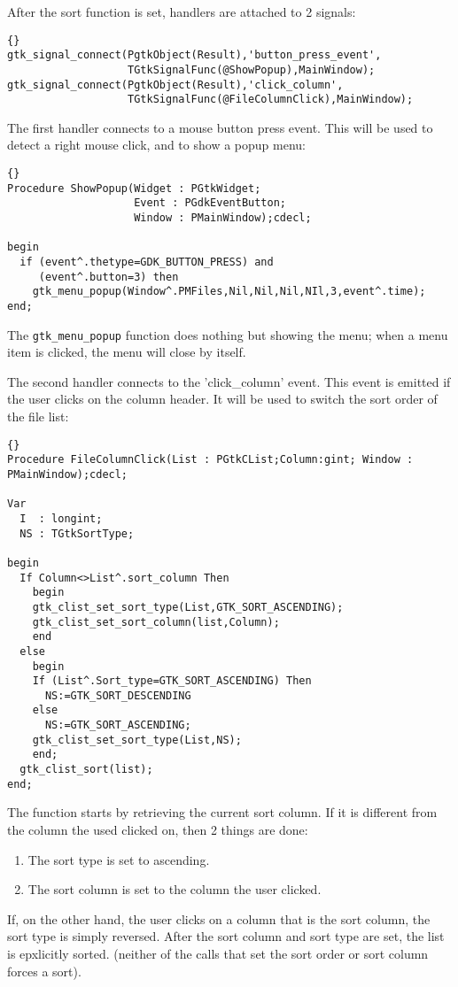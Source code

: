 \documentclass[10pt]{article}
\begin{document}
After the sort function is set, handlers are attached to 2 signals:
\begin{lstlisting}{}
gtk_signal_connect(PgtkObject(Result),'button_press_event',
                   TGtkSignalFunc(@ShowPopup),MainWindow);
gtk_signal_connect(PgtkObject(Result),'click_column',
                   TGtkSignalFunc(@FileColumnClick),MainWindow);
\end{lstlisting}
The first handler connects to a mouse button press event. This will be used
to detect a right mouse click, and to show a popup menu:
\begin{lstlisting}{}
Procedure ShowPopup(Widget : PGtkWidget; 
                    Event : PGdkEventButton; 
                    Window : PMainWindow);cdecl;

begin
  if (event^.thetype=GDK_BUTTON_PRESS) and 
     (event^.button=3) then
    gtk_menu_popup(Window^.PMFiles,Nil,Nil,Nil,NIl,3,event^.time);
end;
\end{lstlisting}
The \lstinline|gtk_menu_popup| function does nothing but showing the menu;
when a menu item is clicked, the menu will close by itself.

The second handler connects to the 'click\_column' event. This event is
emitted if the user clicks on the column header. It will be used to switch
the sort order of the file list:
\begin{lstlisting}{}
Procedure FileColumnClick(List : PGtkCList;Column:gint; Window : PMainWindow);cdecl;

Var 
  I  : longint;
  NS : TGtkSortType;
   
begin
  If Column<>List^.sort_column Then
    begin
    gtk_clist_set_sort_type(List,GTK_SORT_ASCENDING);
    gtk_clist_set_sort_column(list,Column);
    end
  else
    begin
    If (List^.Sort_type=GTK_SORT_ASCENDING) Then 
      NS:=GTK_SORT_DESCENDING
    else
      NS:=GTK_SORT_ASCENDING;
    gtk_clist_set_sort_type(List,NS);
    end;
  gtk_clist_sort(list);
end;
\end{lstlisting}
The function starts by retrieving the current sort column. If it is
different from the column the used clicked on, then 2 things are done:
\begin{enumerate}
\item The sort type is set to ascending.
\item The sort column is set to the column the user clicked.
\end{enumerate}
If, on the other hand, the user clicks on a column that is the sort column, 
the sort type is simply reversed. After the sort column and sort type are 
set, the list is epxlicitly sorted. (neither of the calls that set the sort 
order or sort column forces a sort).
\end{document}
